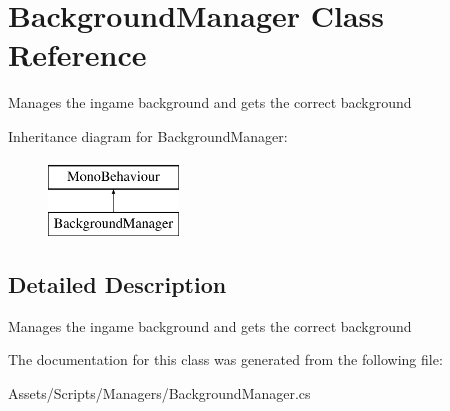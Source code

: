 \hypertarget{class_background_manager}{}\section{Background\+Manager Class Reference}
\label{class_background_manager}


Manages the ingame background and gets the correct background  


Inheritance diagram for Background\+Manager\+:\begin{figure}[H]
\begin{center}
\leavevmode
\includegraphics[height=2.000000cm]{class_background_manager}
\end{center}
\end{figure}


\subsection{Detailed Description}
Manages the ingame background and gets the correct background 



The documentation for this class was generated from the following file\+:\begin{DoxyCompactItemize}
\item 
Assets/\+Scripts/\+Managers/Background\+Manager.\+cs\end{DoxyCompactItemize}
